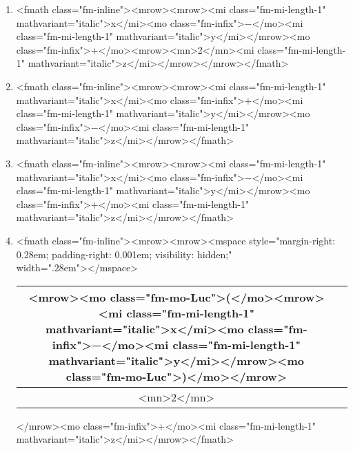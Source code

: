 \documentclass{article}
\begin{document}
\begin{enumerate}[label=(\alph*)]
\item  <fmath class="fm-inline"><mrow><mrow><mi class="fm-mi-length-1" mathvariant="italic">x</mi><mo class="fm-infix">−</mo><mi class="fm-mi-length-1" mathvariant="italic">y</mi></mrow><mo class="fm-infix">+</mo><mrow><mn>2</mn><mi class="fm-mi-length-1" mathvariant="italic">z</mi></mrow></mrow></fmath>
\item  <fmath class="fm-inline"><mrow><mrow><mi class="fm-mi-length-1" mathvariant="italic">x</mi><mo class="fm-infix">+</mo><mi class="fm-mi-length-1" mathvariant="italic">y</mi></mrow><mo class="fm-infix">−</mo><mi class="fm-mi-length-1" mathvariant="italic">z</mi></mrow></fmath>
\item  <fmath class="fm-inline"><mrow><mrow><mi class="fm-mi-length-1" mathvariant="italic">x</mi><mo class="fm-infix">−</mo><mi class="fm-mi-length-1" mathvariant="italic">y</mi></mrow><mo class="fm-infix">+</mo><mi class="fm-mi-length-1" mathvariant="italic">z</mi></mrow></fmath>
\item  <fmath class="fm-inline"><mrow><mrow><mspace style="margin-right: 0.28em; padding-right: 0.001em; visibility: hidden;" width=".28em">‌</mspace>\begin{tabular}{|c|c|}
\hline
<mrow><mo class="fm-mo-Luc">(</mo><mrow><mi class="fm-mi-length-1" mathvariant="italic">x</mi><mo class="fm-infix">−</mo><mi class="fm-mi-length-1" mathvariant="italic">y</mi></mrow><mo class="fm-mo-Luc">)</mo></mrow> \\
\hline
<mn>2</mn> \\
\hline
\end{tabular}
</mrow><mo class="fm-infix">+</mo><mi class="fm-mi-length-1" mathvariant="italic">z</mi></mrow></fmath>
\end{enumerate}
\newpage
\end{document}
